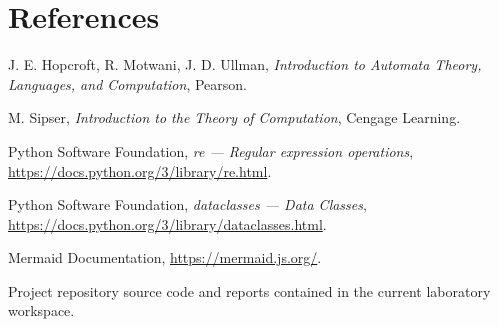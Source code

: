 \documentclass[a4paper,12pt]{article}
\begin{document}


\section{References}

\begin{enumerate}[label={[}\arabic*{]}]
    \item J. E. Hopcroft, R. Motwani, J. D. Ullman, \emph{Introduction to Automata Theory, Languages, and Computation}, Pearson.
    \item M. Sipser, \emph{Introduction to the Theory of Computation}, Cengage Learning.
    \item Python Software Foundation, \emph{re --- Regular expression operations}, \url{https://docs.python.org/3/library/re.html}.
    \item Python Software Foundation, \emph{dataclasses --- Data Classes}, \url{https://docs.python.org/3/library/dataclasses.html}.
    \item Mermaid Documentation, \url{https://mermaid.js.org/}.
    \item Project repository source code and reports contained in the current laboratory workspace.
\end{enumerate}
\end{document}
